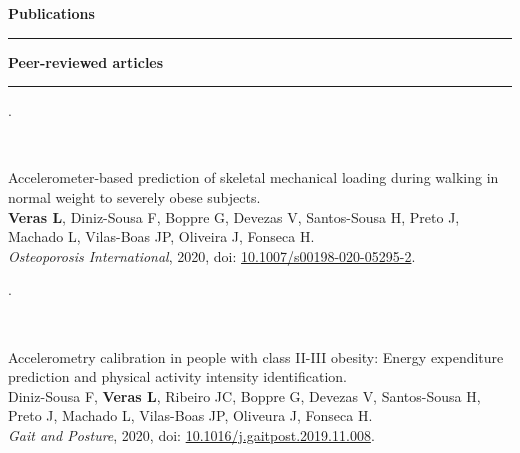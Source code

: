 \documentclass[10t]{article}
\begin{document}
\vspace{2em}


\noindent
{\large \textbf{Publications}} \\
\noindent \rule{\linewidth}{0.8pt}

\vspace{1em}

\noindent
\textbf{Peer-reviewed articles} \rule{12.9cm}{0.8pt}

\vspace{1em}

\noindent
\begin{minipage}[t]{0.15\linewidth}
	.
\end{minipage}
\
\begin{minipage}[t]{0.85\linewidth}
\begin{minipage}[t]{\columnwidth}
	Accelerometer-based prediction of skeletal mechanical loading during walking in normal weight to severely obese subjects. \\
	\textbf{Veras L}, Diniz-Sousa F, Boppre G, Devezas V, Santos-Sousa H, Preto J, Machado L, Vilas-Boas JP, Oliveira J, Fonseca H.  \\
	\textit{Osteoporosis International}, 2020, doi: \href{http://dx.doi.org/10.1007/s00198-020-05295-2}{10.1007/s00198-020-05295-2}.
\end{minipage}
\end{minipage}

\vspace{0.5em}

\noindent
\begin{minipage}[t]{0.15\linewidth}
	.
\end{minipage}
\
\begin{minipage}[t]{0.85\linewidth}
\begin{minipage}[t]{\columnwidth}
	Accelerometry calibration in people with class II-III obesity: Energy expenditure prediction and physical activity intensity identification. \\
	Diniz-Sousa F, \textbf{Veras L}, Ribeiro JC, Boppre G, Devezas V, Santos-Sousa H, Preto J, Machado L, Vilas-Boas JP, Oliveura J, Fonseca H. \\
	\textit{Gait and Posture}, 2020, doi: \href{https://doi.org/10.1016/j.gaitpost.2019.11.008}{10.1016/j.gaitpost.2019.11.008}.
\end{minipage}
\end{minipage}

\vspace{2em}
\end{document}
